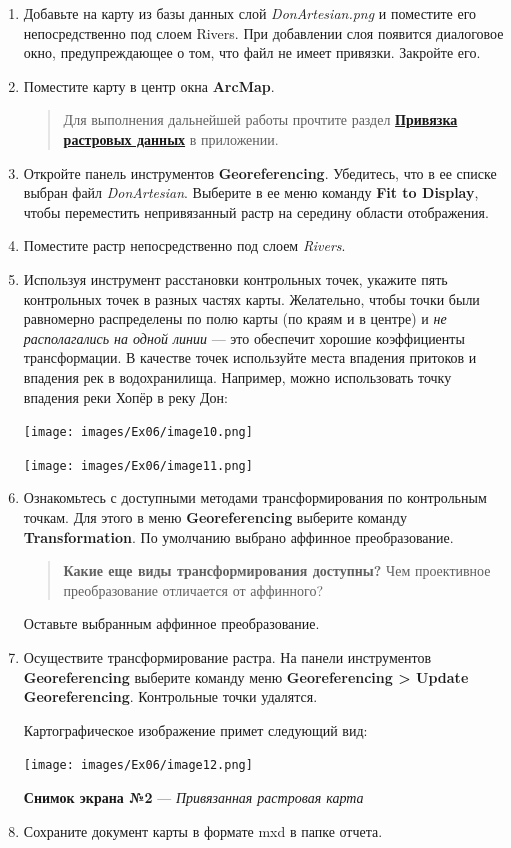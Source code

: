 \documentclass[12pt,]{book}
\begin{document}
\begin{enumerate}
\def\labelenumi{\arabic{enumi}.}
\item
  Добавьте на карту из базы данных слой \emph{DonArtesian.png} и поместите его непосредственно под слоем Rivers. При добавлении слоя появится диалоговое окно, предупреждающее о том, что файл не имеет привязки. Закройте его.
\item
  Поместите карту в центр окна \textbf{ArcMap}.

  \begin{quote}
  Для выполнения дальнейшей работы прочтите раздел \textbf{\protect\hyperlink{manual-georef}{Привязка растровых данных}} в приложении.
  \end{quote}
\item
  Откройте панель инструментов \textbf{Georeferencing}. Убедитесь, что в ее списке выбран файл \emph{DonArtesian}. Выберите в ее меню команду \textbf{Fit to Display}, чтобы переместить непривязанный растр на середину области отображения.
\item
  Поместите растр непосредственно под слоем \emph{Rivers}.
\item
  Используя инструмент расстановки контрольных точек, укажите пять контрольных точек в разных частях карты. Желательно, чтобы точки были равномерно распределены по полю карты (по краям и в центре) и \emph{не располагались на одной линии} --- это обеспечит хорошие коэффициенты трансформации. В качестве точек используйте места впадения притоков и впадения рек в водохранилища. Например, можно использовать точку впадения реки Хопёр в реку Дон:

  \texttt{[image: images/Ex06/image10.png]}

  \texttt{[image: images/Ex06/image11.png]}
\item
  Ознакомьтесь с доступными методами трансформирования по контрольным точкам. Для этого в меню \textbf{Georeferencing} выберите команду \textbf{Transformation}. По умолчанию выбрано аффинное преобразование.

  \begin{quote}
  \textbf{Какие еще виды трансформирования доступны?} Чем проективное преобразование отличается от аффинного?
  \end{quote}

  Оставьте выбранным аффинное преобразование.
\item
  Осуществите трансформирование растра. На панели инструментов \textbf{Georeferencing} выберите команду меню \textbf{Georeferencing \textgreater{} Update Georeferencing}. Контрольные точки удалятся.

  Картографическое изображение примет следующий вид:

  \texttt{[image: images/Ex06/image12.png]}

  \textbf{Снимок экрана №2} --- \emph{Привязанная растровая карта}
\item
  Сохраните документ карты в формате mxd в папке отчета.
\end{enumerate}
\end{document}
